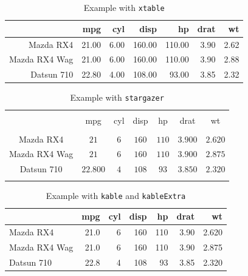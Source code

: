 \documentclass{article}\usepackage[]{graphicx}\usepackage[]{xcolor}
\begin{document}
\begin{table}[ht]
\centering
\caption{Example with \texttt{xtable}} 
\begin{tabular}{rrrrrrr}
  \toprule
 & mpg & cyl & disp & hp & drat & wt \\ 
  \midrule
Mazda RX4 & 21.00 & 6.00 & 160.00 & 110.00 & 3.90 & 2.62 \\ 
  Mazda RX4 Wag & 21.00 & 6.00 & 160.00 & 110.00 & 3.90 & 2.88 \\ 
  Datsun 710 & 22.80 & 4.00 & 108.00 & 93.00 & 3.85 & 2.32 \\ 
   \bottomrule
\end{tabular}
\end{table}

\begin{table}[!htbp] \centering 
  \caption{Example with \texttt{stargazer}} 
  \label{} 
\begin{tabular}{@{\extracolsep{5pt}} ccccccc} 
\\[-1.8ex]\hline 
\hline \\[-1.8ex] 
 & mpg & cyl & disp & hp & drat & wt \\ 
\hline \\[-1.8ex] 
Mazda RX4 & $21$ & $6$ & $160$ & $110$ & $3.900$ & $2.620$ \\ 
Mazda RX4 Wag & $21$ & $6$ & $160$ & $110$ & $3.900$ & $2.875$ \\ 
Datsun 710 & $22.800$ & $4$ & $108$ & $93$ & $3.850$ & $2.320$ \\ 
\hline \\[-1.8ex] 
\end{tabular} 
\end{table} 
\begin{table}

\caption{\label{tab:unnamed-chunk-2}Example with  \texttt{kable}  and \texttt{kableExtra}}
\centering
\begin{tabular}[t]{lrrrrrr}
\toprule
  & mpg & cyl & disp & hp & drat & wt\\
\midrule
Mazda RX4 & 21.0 & 6 & 160 & 110 & 3.90 & 2.620\\
Mazda RX4 Wag & 21.0 & 6 & 160 & 110 & 3.90 & 2.875\\
Datsun 710 & 22.8 & 4 & 108 & 93 & 3.85 & 2.320\\
\bottomrule
\end{tabular}
\end{table}
\end{document}
